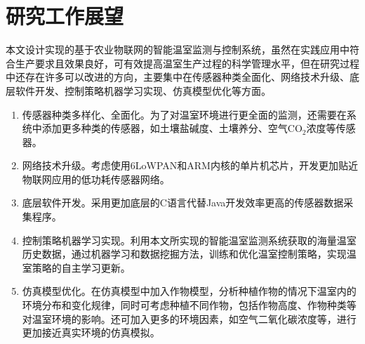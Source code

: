 \section{研究工作展望}
本文设计实现的基于农业物联网的智能温室监测与控制系统，虽然在实践应用中符合生产要求且效果良好，可有效提高温室生产过程的科学管理水平，但在研究过程中还存在许多可以改进的方向，主要集中在传感器种类全面化、网络技术升级、底层软件开发、控制策略机器学习实现、仿真模型优化等方面。
	\begin{enumerate}
		\item 传感器种类多样化、全面化。为了对温室环境进行更全面的监测，还需要在系统中添加更多种类的传感器，如土壤盐碱度、土壤养分、空气$\text{CO}_{2}$浓度等传感器。
		\item 网络技术升级。考虑使用6LoWPAN和ARM内核的单片机芯片，开发更加贴近物联网应用的低功耗传感器网络。
		\item 底层软件开发。采用更加底层的C语言代替Java开发效率更高的传感器数据采集程序。
		\item 控制策略机器学习实现。利用本文所实现的智能温室监测系统获取的海量温室历史数据，通过机器学习和数据挖掘方法，训练和优化温室控制策略，实现温室策略的自主学习更新。
		\item 仿真模型优化。在仿真模型中加入作物模型，分析种植作物的情况下温室内的环境分布和变化规律，同时可考虑种植不同作物，包括作物高度、作物种类等对温室环境的影响。还可加入更多的环境因素，如空气二氧化碳浓度等，进行更加接近真实环境的仿真模拟。
 	\end{enumerate}
